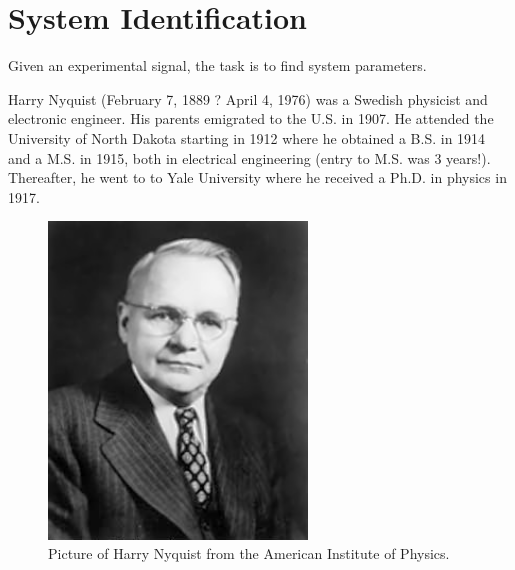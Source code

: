 \documentclass[12pt,letter]{article}
\begin{document}
%	
%	

	\setcounter{section}{5}	
	\setcounter{figure}{0}   
	\renewcommand\thefigure{\thesection.\arabic{figure}}


\section{System Identification}

Given an experimental signal, the task is to find system parameters. 


\begin{review}
	\label{sec:Harry_Nyquist}
		
		Harry Nyquist (February 7, 1889 ? April 4, 1976) was a Swedish physicist and electronic engineer. His parents emigrated to the U.S. in 1907.  He attended the University of North Dakota starting in 1912 where he obtained a B.S. in 1914 and a M.S. in 1915, both in electrical engineering (entry to M.S. was 3 years!). Thereafter, he went to to Yale University where he received a Ph.D. in physics in 1917.

		\begin{figure}[H]
			\centering
			\includegraphics[width=2.71in]{../figures/Harry_Nyquist.jpg}
			\caption{Picture of Harry Nyquist from the American Institute of Physics. }
			\label{fig:fragility_curve}
		\end{figure}


\end{review}
\end{document}
